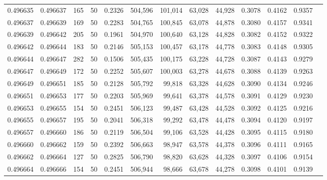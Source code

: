 \begin{tabular}{rrrrrrrrrrrrr}
0.496635 & 0.496637 &   165 &  50 &                                     0.2326 & 504,596 & 101,014 &  63,028 &  44,928 & 0.3078 & 0.4162 & 0.9357 \\
0.496637 & 0.496639 &   169 &  50 &                                     0.2283 & 504,765 & 100,845 &  63,078 &  44,878 & 0.3080 & 0.4157 & 0.9341 \\
0.496639 & 0.496642 &   205 &  50 &                                     0.1961 & 504,970 & 100,640 &  63,128 &  44,828 & 0.3082 & 0.4152 & 0.9322 \\
0.496642 & 0.496644 &   183 &  50 &                                     0.2146 & 505,153 & 100,457 &  63,178 &  44,778 & 0.3083 & 0.4148 & 0.9305 \\
0.496644 & 0.496647 &   282 &  50 &                                     0.1506 & 505,435 & 100,175 &  63,228 &  44,728 & 0.3087 & 0.4143 & 0.9279 \\
0.496647 & 0.496649 &   172 &  50 &                                     0.2252 & 505,607 & 100,003 &  63,278 &  44,678 & 0.3088 & 0.4139 & 0.9263 \\
0.496649 & 0.496651 &   185 &  50 &                                     0.2128 & 505,792 &  99,818 &  63,328 &  44,628 & 0.3090 & 0.4134 & 0.9246 \\
0.496651 & 0.496653 &   177 &  50 &                                     0.2203 & 505,969 &  99,641 &  63,378 &  44,578 & 0.3091 & 0.4129 & 0.9230 \\
0.496653 & 0.496655 &   154 &  50 &                                     0.2451 & 506,123 &  99,487 &  63,428 &  44,528 & 0.3092 & 0.4125 & 0.9216 \\
0.496655 & 0.496657 &   195 &  50 &                                     0.2041 & 506,318 &  99,292 &  63,478 &  44,478 & 0.3094 & 0.4120 & 0.9197 \\
0.496657 & 0.496660 &   186 &  50 &                                     0.2119 & 506,504 &  99,106 &  63,528 &  44,428 & 0.3095 & 0.4115 & 0.9180 \\
0.496660 & 0.496662 &   159 &  50 &                                     0.2392 & 506,663 &  98,947 &  63,578 &  44,378 & 0.3096 & 0.4111 & 0.9165 \\
0.496662 & 0.496664 &   127 &  50 &                                     0.2825 & 506,790 &  98,820 &  63,628 &  44,328 & 0.3097 & 0.4106 & 0.9154 \\
0.496664 & 0.496666 &   154 &  50 &                                     0.2451 & 506,944 &  98,666 &  63,678 &  44,278 & 0.3098 & 0.4101 & 0.9139 \\

\end{tabular}
